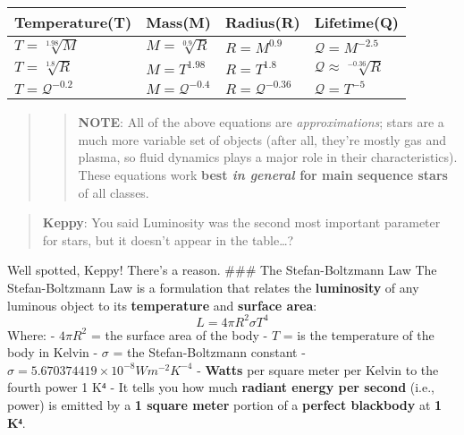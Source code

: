 \documentclass[
  letterpaper,
]{book}
\begin{document}
\begin{longtable}[]{@{}
  >{\centering\arraybackslash}p{}
  >{\centering\arraybackslash}p{}
  >{\centering\arraybackslash}p{}
  >{\centering\arraybackslash}p{}@{}}
\toprule\noalign{}
\begin{minipage}[b]{\linewidth}\centering
Temperature(T)
\end{minipage} & \begin{minipage}[b]{\linewidth}\centering
Mass(M)
\end{minipage} & \begin{minipage}[b]{\linewidth}\centering
Radius(R)
\end{minipage} & \begin{minipage}[b]{\linewidth}\centering
Lifetime(Q)
\end{minipage} \\
\midrule\noalign{}
\endhead
\bottomrule\noalign{}
\endlastfoot
\(T=\sqrt[1.98]{M}\) & \(M=\sqrt[0.9]{R}\) & \(R=M^{0.9}\) &
\(\mathcal{Q}=M^{-2.5}\) \\
\(T=\sqrt[1.8]{R}\) & \(M=T^{1.98}\) & \(R=T^{1.8}\) &
\(\mathcal{Q} \approx \sqrt[-0.36]{R}\) \\
\(T=\mathcal{Q}^{-0.2}\) & \(M=\mathcal{Q}^{-0.4}\) &
\(R=\mathcal{Q}^{-0.36}\) & \(\mathcal{Q}=T^{-5}\) \\
\end{longtable}

\begin{quote}
\begin{quote}
\textbf{NOTE}: All of the above equations are \emph{approximations};
stars are a much more variable set of objects (after all, they're mostly
gas and plasma, so fluid dynamics plays a major role in their
characteristics). These equations work \textbf{best \emph{in general}
for main sequence stars} of all classes.
\end{quote}
\end{quote}

\begin{quote}
\textbf{Keppy}: You said Luminosity was the second most important
parameter for stars, but it doesn't appear in the table\ldots?
\end{quote}

Well spotted, Keppy! There's a reason. \#\#\# The Stefan-Boltzmann Law
The Stefan-Boltzmann Law is a formulation that relates the
\textbf{luminosity} of any luminous object to its \textbf{temperature}
and \textbf{surface area}: \[
L = 4 \pi R^2 \sigma T^4
\] Where: - \(4 \pi R^2\) = the surface area of the body - \(T\) = is
the temperature of the body in Kelvin - \(σ\) = the Stefan-Boltzmann
constant - \(\sigma = 5.670374419 \times 10^{-8} W m^{-2}K^{-4}\) -
\textbf{Watts} per square meter per Kelvin to the fourth power 1 K⁴ - It
tells you how much \textbf{radiant energy per second} (i.e., power) is
emitted by a \textbf{1 square meter} portion of a \textbf{perfect
blackbody} at \textbf{1 K⁴}.
\end{document}
